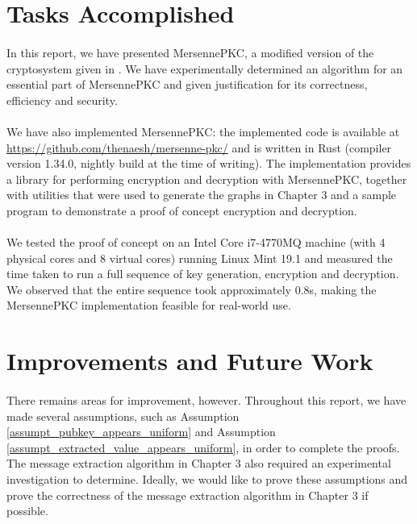 \section{Tasks Accomplished}
\paragraph{}
In this report, we have presented MersennePKC, a modified version of the cryptosystem given in \cite{aggarwal2018new}. We have experimentally determined an algorithm for an essential part of MersennePKC and given justification for its correctness, efficiency and security.

\paragraph{}
We have also implemented MersennePKC: the implemented code is available at \url{https://github.com/thenaesh/mersenne-pkc/} and is written in Rust (compiler version 1.34.0, nightly build at the time of writing). The implementation provides a library for performing encryption and decryption with MersennePKC, together with utilities that were used to generate the graphs in Chapter 3 and a sample program to demonstrate a proof of concept encryption and decryption.

\paragraph{}
We tested the proof of concept on an Intel Core i7-4770MQ machine (with 4 physical cores and 8 virtual cores) running Linux Mint 19.1 and measured the time taken to run a full sequence of key generation, encryption and decryption. We observed that the entire sequence took approximately $0.8$s, making the MersennePKC implementation feasible for real-world use.

\section{Improvements and Future Work}
\paragraph{}
There remains areas for improvement, however. Throughout this report, we have made several assumptions, such as Assumption \ref{assumpt_pubkey_appears_uniform} and Assumption \ref{assumpt_extracted_value_appears_uniform}, in order to complete the proofs. The message extraction algorithm in Chapter 3 also required an experimental investigation to determine. Ideally, we would like to prove these assumptions and prove the correctness of the message extraction algorithm in Chapter 3 if possible.


